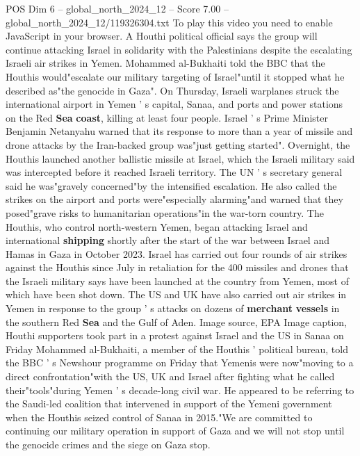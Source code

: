 \begin{textsample}{POS Dim 6 – global\_north\_2024\_12 – Score 7.00 – global\_north\_2024\_12/119326304.txt}  \label{ex:f6_pos_261}
To play this video you need to enable JavaScript in your browser.
A Houthi political official says the group will continue attacking Israel in solidarity with the Palestinians despite the escalating Israeli air strikes in Yemen.
Mohammed al-Bukhaiti told the BBC that the Houthis would"escalate our military targeting of Israel"until it stopped what he described as"the genocide in Gaza".
On Thursday, Israeli warplanes struck the international airport in Yemen ' s capital, Sanaa, and ports and power stations on the Red \textbf{Sea} \textbf{coast}, killing at least four people.
Israel ' s Prime Minister Benjamin Netanyahu warned that its response to more than a year of missile and drone attacks by the Iran-backed group was"just getting started".
Overnight, the Houthis launched another ballistic missile at Israel, which the Israeli military said was intercepted before it reached Israeli territory.
The UN ' s secretary general said he was"gravely concerned"by the intensified escalation.
He also called the strikes on the airport and ports were"especially alarming"and warned that they posed"grave risks to humanitarian operations"in the war-torn country.
The Houthis, who control north-western Yemen, began attacking Israel and international \textbf{shipping} shortly after the start of the war between Israel and Hamas in Gaza in October 2023.
Israel has carried out four rounds of air strikes against the Houthis since July in retaliation for the 400 missiles and drones that the Israeli military says have been launched at the country from Yemen, most of which have been shot down.
The US and UK have also carried out air strikes in Yemen in response to the group ' s attacks on dozens of \textbf{merchant} \textbf{vessels} in the southern Red \textbf{Sea} and the Gulf of Aden.
Image source, EPA Image caption, Houthi supporters took part in a protest against Israel and the US in Sanaa on Friday Mohammed al-Bukhaiti, a member of the Houthis ' political bureau, told the BBC ' s Newshour programme on Friday that Yemenis were now"moving to a direct confrontation"with the US, UK and Israel after fighting what he called their"tools"during Yemen ' s decade-long civil war.
He appeared to be referring to the Saudi-led coalition that intervened in support of the Yemeni government when the Houthis seized control of Sanaa in 2015."We are committed to continuing our military operation in support of Gaza and we will not stop until the genocide crimes and the siege on Gaza stop.

\end{textsample}

